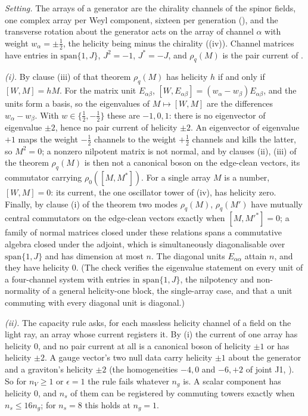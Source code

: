 \emph{Setting.} The arrays of a generator are the chirality channels of the spinor fields, one complex array per Weyl component, sixteen per generation (), and the transverse rotation about the generator acts on the array of channel $\alpha$ with weight $w_{\alpha} = \pm\tfrac12$, the helicity being minus the chirality ((iv)). Channel matrices have entries in $\mathrm{span}\{1, J\}$, $J^{2} = -1$, $J^{*} = -J$, and $\rho_{q}(M)$ is the pair current of .

\emph{(i).} By clause (iii) of that theorem $\rho_{q}(M)$ has helicity $h$ if and only if $[W, M] = hM$. For the matrix unit $E_{\alpha\beta}$, $[W, E_{\alpha\beta}] = (w_{\alpha} - w_{\beta})E_{\alpha\beta}$, and the units form a basis, so the eigenvalues of $M \mapsto [W, M]$ are the differences $w_{\alpha} - w_{\beta}$. With $w \in \{\tfrac12, -\tfrac12\}$ these are $-1, 0, 1$: there is no eigenvector of eigenvalue $\pm 2$, hence no pair current of helicity $\pm 2$. An eigenvector of eigenvalue $+1$ maps the weight $-\tfrac12$ channels to the weight $+\tfrac12$ channels and kills the latter, so $M^{2} = 0$; a nonzero nilpotent matrix is not normal, and by clauses (ii), (iii) of the theorem $\rho_{q}(M)$ is then not a canonical boson on the edge-clean vectors, its commutator carrying $\rho_{0}([M, M^{*}])$. For a single array $M$ is a number, $[W, M] = 0$: its current, the one oscillator tower of (iv), has helicity zero. Finally, by clause (i) of the theorem two modes $\rho_{q}(M)$, $\rho_{q}(M')$ have mutually central commutators on the edge-clean vectors exactly when $[M, M'^{*}] = 0$; a family of normal matrices closed under these relations spans a commutative algebra closed under the adjoint, which is simultaneously diagonalisable over $\mathrm{span}\{1, J\}$ and has dimension at most $n$. The diagonal units $E_{\alpha\alpha}$ attain $n$, and they have helicity $0$. (The check verifies the eigenvalue statement on every unit of a four-channel system with entries in $\mathrm{span}\{1, J\}$, the nilpotency and non-normality of a general helicity-one block, the single-array case, and that a unit commuting with every diagonal unit is diagonal.)

\emph{(ii).} The capacity rule asks, for each massless helicity channel of a field on the light ray, an array whose current registers it. By (i) the current of one array has helicity $0$, and no pair current at all is a canonical boson of helicity $\pm 1$ or has helicity $\pm 2$. A gauge vector's two null data carry helicity $\pm 1$ about the generator and a graviton's helicity $\pm 2$ (the homogeneities $-4, 0$ and $-6, +2$ of joint J1, ). So for $n_{V} \ge 1$ or $\epsilon = 1$ the rule fails whatever $n_{g}$ is. A scalar component has helicity $0$, and $n_{s}$ of them can be registered by commuting towers exactly when $n_{s} \le 16n_{g}$; for $n_{s} = 8$ this holds at $n_{g} = 1$.

